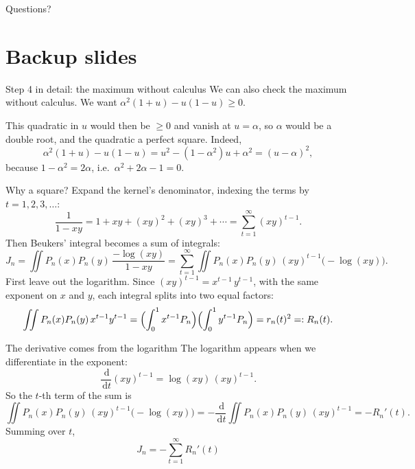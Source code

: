 \documentclass[aspectratio=169,11pt]{beamer}
\newcommand{\dd}{\,\mathrm{d}}
\begin{document}
\begin{frame}[standout]
  Questions?
\end{frame}

\appendix
\section{Backup slides}

\begin{frame}{Step 4 in detail: the maximum without calculus}
  We can also check the maximum without calculus. We want $\alpha^2(1+u)-u(1-u)\ge0$.
  \medskip

  This quadratic in $u$ would then be $\ge0$ and vanish at $u=\alpha$, so $\alpha$ would be a
  double root, and the quadratic a perfect square. Indeed,
  \[
    \alpha^2(1+u)-u(1-u)=u^2-(1-\alpha^2)u+\alpha^2=(u-\alpha)^2,
  \]
  because $1-\alpha^2=2\alpha$, i.e.\ $\alpha^2+2\alpha-1=0$.
\end{frame}

\begin{frame}{Why a square?}
  Expand the kernel's denominator, indexing the terms by $t=1,2,3,\dots$:
  \[
    \frac1{1-xy}=1+xy+(xy)^2+(xy)^3+\cdots=\sum_{t=1}^\infty(xy)^{t-1}.
  \]
  Then Beukers' integral becomes a sum of integrals:
  \[
    J_n=\iint P_n(x)P_n(y)\,\frac{-\log(xy)}{1-xy}
    =\sum_{t=1}^\infty\iint P_n(x)P_n(y)\,(xy)^{t-1}\bigl(-\log(xy)\bigr).
  \]
  First leave out the logarithm. Since $(xy)^{t-1}=x^{t-1}\,y^{t-1}$, with the same
  exponent on $x$ and $y$, each integral splits into two equal factors:
  \[
    \iint P_n(x)P_n(y)\,x^{t-1}y^{t-1}
    =\Bigl(\int_0^1x^{t-1}P_n\Bigr)\Bigl(\int_0^1y^{t-1}P_n\Bigr)=r_n(t)^2=:R_n(t).
  \]
\end{frame}

\begin{frame}{The derivative comes from the logarithm}
  The logarithm appears when we differentiate in the exponent:
  \[
    \frac{\dd}{\dd t}(xy)^{t-1}=\log(xy)\,(xy)^{t-1}.
  \]
  So the $t$-th term of the sum is
  \[
    \iint P_n(x)P_n(y)\,(xy)^{t-1}\bigl(-\log(xy)\bigr)
    =-\frac{\dd}{\dd t}\iint P_n(x)P_n(y)\,(xy)^{t-1}=-R_n'(t).
  \]
  Summing over $t$,
  \[
    \boxed{\;J_n=-\sum_{t=1}^\infty R_n'(t)\;}
  \]
\end{frame}
\end{document}
